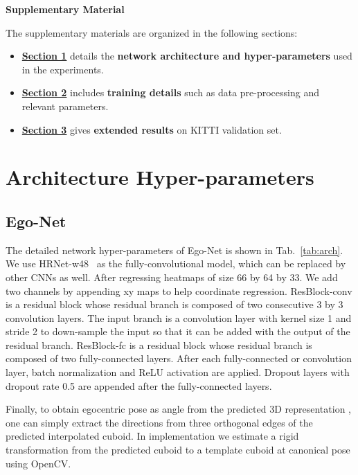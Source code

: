 \documentclass[final]{cvpr}
\begin{document}
{\small
	
	
}

\setcounter{section}{0}
\clearpage
\begin{center}
	\large{\textbf{Supplementary Material}}
\end{center}
The supplementary materials are organized in the following sections:
\begin{itemize}
	\item \hyperref[sec1]{\textbf{Section 1}} details the \textbf{network architecture and hyper-parameters} used in the experiments.
	\item \hyperref[sec2]{\textbf{Section 2}} includes \textbf{training details} such as data pre-processing and relevant parameters.
	\item \hyperref[sec3]{\textbf{Section 3}} gives \textbf{extended results} on KITTI validation set.
\end{itemize}
\section{Architecture Hyper-parameters} \label{sec1}
\subsection{Ego-Net}
The detailed network hyper-parameters of Ego-Net is shown in Tab.~\ref{tab:arch}. We use HRNet-w48~\cite{sun2019deep} as the fully-convolutional model, which can be replaced by other CNNs as well. After regressing heatmaps of size 66 by 64 by 33. We add two channels by appending xy maps to help coordinate regression. ResBlock-conv is a residual block whose residual branch is composed of two consecutive 3 by 3 convolution layers. The input branch is a convolution layer with kernel size 1 and stride 2 to down-sample the input so that it can be added with the output of the residual branch. ResBlock-fc is a residual block whose residual branch is composed of two fully-connected layers. After each fully-connected or convolution layer, batch normalization and ReLU activation are applied. Dropout layers with dropout rate 0.5 are appended after the fully-connected layers.

Finally, to obtain egocentric pose as angle from the predicted 3D representation , one can simply extract the directions from three orthogonal edges of the predicted interpolated cuboid. In implementation we estimate a rigid transformation from the predicted cuboid to a template cuboid at canonical pose using OpenCV.
 
\end{document}
